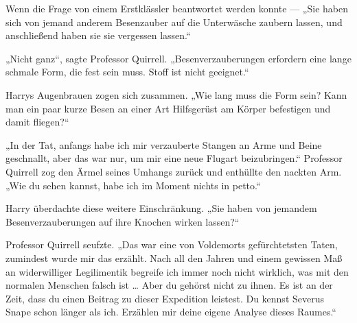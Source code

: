 Wenn die Frage von einem Erstklässler beantwortet werden konnte —
„Sie haben sich von jemand anderem Besenzauber auf die Unterwäsche zaubern lassen, und anschließend haben sie sie vergessen lassen.“

„Nicht ganz“, sagte Professor Quirrell.
„Besenverzauberungen erfordern eine lange schmale Form, die fest sein muss. Stoff ist nicht geeignet.“

Harrys Augenbrauen zogen sich zusammen.
„Wie lang muss die Form sein? Kann man ein paar kurze Besen an einer Art Hilfsgerüst am Körper befestigen und damit fliegen?“

„In der Tat, anfangs habe ich mir verzauberte Stangen an Arme und Beine geschnallt, aber das war nur, um mir eine neue Flugart beizubringen.“
Professor Quirrell zog den Ärmel seines Umhangs zurück und enthüllte den nackten Arm.
„Wie du sehen kannst, habe ich im Moment nichts in petto.“

Harry überdachte diese weitere Einschränkung.
„Sie haben von jemandem Besenverzauberungen auf ihre Knochen wirken lassen?“

Professor Quirrell seufzte.
„Das war eine von Voldemorts gefürchtetsten Taten, zumindest wurde mir das erzählt. Nach all den Jahren und einem gewissen Maß an widerwilliger Legilimentik begreife ich immer noch nicht wirklich, was mit den normalen Menschen falsch ist … Aber du gehörst nicht zu ihnen. Es ist an der Zeit, dass du einen Beitrag zu dieser Expedition leistest. Du kennst Severus Snape schon länger als ich. Erzählen mir deine eigene Analyse dieses Raumes.“

